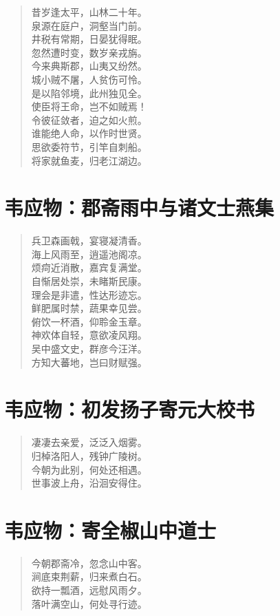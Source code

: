 \documentclass[12pt,oneside]{book}
\newenvironment{shici}{
\begin{verse}
\centering\large\hspace{12pt}}
{\end{verse}}
\begin{document}
\begin{shici}
昔岁逢太平，山林二十年。\\
泉源在庭户，洞壑当门前。\\
井税有常期，日晏犹得眠。\\
忽然遭时变，数岁亲戎旃。\\
今来典斯郡，山夷又纷然。\\
城小贼不屠，人贫伤可怜。\\
是以陷邻境，此州独见全。\\
使臣将王命，岂不如贼焉！\\
令彼征敛者，迫之如火煎。\\
谁能绝人命，以作时世贤。\\
思欲委符节，引竿自刺船。\\
将家就鱼麦，归老江湖边。
\end{shici}


\chapter{韦应物：郡斋雨中与诸文士燕集}
\begin{shici}
兵卫森画戟，宴寝凝清香。\\
海上风雨至，逍遥池阁凉。\\
烦疴近消散，嘉宾复满堂。\\
自惭居处崇，未睹斯民康。\\
理会是非遣，性达形迹忘。\\
鲜肥属时禁，蔬果幸见尝。\\
俯饮一杯酒，仰聆金玉章。\\
神欢体自轻，意欲凌风翔。\\
吴中盛文史，群彦今汪洋。\\
方知大蕃地，岂曰财赋强。
\end{shici}

\chapter{韦应物：初发扬子寄元大校书}
\begin{shici}
凄凄去亲爱，泛泛入烟雾。\\
归棹洛阳人，残钟广陵树。\\
今朝为此别，何处还相遇。\\
世事波上舟，沿洄安得住。
\end{shici}

\chapter{韦应物：寄全椒山中道士}
\begin{shici}
今朝郡斋冷，忽念山中客。\\
涧底束荆薪，归来煮白石。\\
欲持一瓢酒，远慰风雨夕。\\
落叶满空山，何处寻行迹。
\end{shici}
\end{document}
